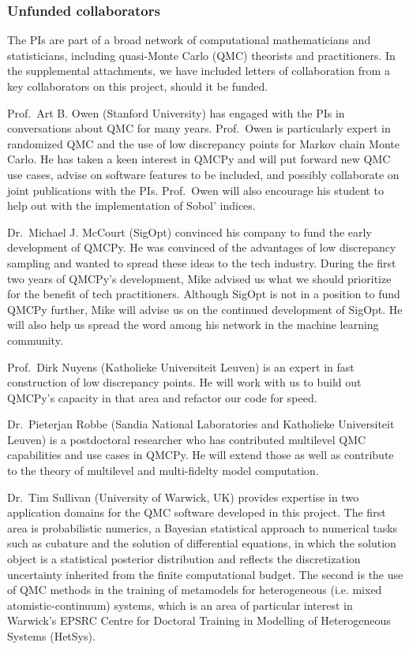 \documentclass[11pt]{NSFamsart}
\begin{document}
\subsubsection*{Unfunded collaborators} The PIs are part of a broad network of computational mathematicians and statisticians, including quasi-Monte Carlo (QMC) theorists and practitioners.  In the supplemental attachments, we have included letters of collaboration from a key collaborators on this project, should it be funded.

Prof.\ Art B. Owen (Stanford University) has engaged with the PIs in conversations about QMC for many years.  Prof.\ Owen is particularly expert in randomized QMC and the use of low discrepancy points for Markov chain Monte Carlo.  He has taken a keen interest in QMCPy and will put forward new QMC use cases, advise on software features to be included, and possibly collaborate on joint publications with the PIs.  Prof.\ Owen will also encourage his student to help out with the implementation of Sobol' indices.

Dr.\ Michael J. McCourt (SigOpt) convinced his company to fund the early development of QMCPy.  He was convinced of the advantages of low discrepancy sampling and wanted to spread these ideas to the tech industry.  During the first two years of QMCPy's development, Mike advised us what we should prioritize for the benefit of tech practitioners.  Although SigOpt is not in a position to fund QMCPy further, Mike will advise us on the continued development of SigOpt.  He will also help us spread the word among his network in the machine learning community.

Prof.\ Dirk Nuyens (Katholieke Universiteit Leuven) is an expert in fast construction of low discrepancy points.  He will work with us to build out QMCPy's capacity in that area and refactor our code for speed.

Dr.\ Pieterjan Robbe (Sandia National Laboratories and Katholieke Universiteit Leuven) is a postdoctoral researcher who has contributed multilevel QMC capabilities and use cases in QMCPy.  He will extend those as well as contribute to the theory of multilevel and multi-fidelty model computation.

Dr.\ Tim Sullivan (University of Warwick, UK) provides expertise in two application domains for the QMC software developed in this project.  The first area is probabilistic numerics, a Bayesian statistical approach to numerical tasks such as cubature and the solution of differential equations, in which the solution object is a statistical posterior distribution and reflects the discretization uncertainty inherited from the finite computational budget.  The second  is the use of QMC methods in the training of metamodels for heterogeneous (i.e. mixed atomistic-continuum) systems, which is an area of particular interest in Warwick's EPSRC Centre for Doctoral Training in Modelling of Heterogeneous Systems (HetSys).
\end{document}
